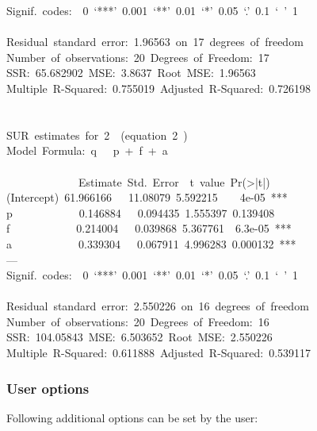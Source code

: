 \documentclass[article]{jss}
\begin{document}
{Signif.~codes:~~0~`***'~0.001~`**'~0.01~`*'~0.05~`.'~0.1~`~'~1~\\
~\\
Residual~standard~error:~1.96563~on~17~degrees~of~freedom~\\
Number~of~observations:~20~Degrees~of~Freedom:~17~\\
SSR:~65.682902~MSE:~3.8637~Root~MSE:~1.96563~\\
Multiple~R-Squared:~0.755019~Adjusted~R-Squared:~0.726198~\\
~\\
~\\
SUR~estimates~for~2~~(equation~2~)~\\
Model~Formula:~q~~~p~+~f~+~a\\
\\
\mbox{}~~~~~~~~~~~~~Estimate~Std.~Error~~t~value~Pr(>|t|)~\\
(Intercept)~61.966166~~~11.08079~5.592215~~~~4e-05~***~\\
p~~~~~~~~~~~~0.146884~~~0.094435~1.555397~0.139408~\\
f~~~~~~~~~~~~0.214004~~~0.039868~5.367761~~6.3e-05~***~\\
a~~~~~~~~~~~~0.339304~~~0.067911~4.996283~0.000132~***~\\
---~\\
Signif.~codes:~~0~`***'~0.001~`**'~0.01~`*'~0.05~`.'~0.1~`~'~1~\\
~\\
Residual~standard~error:~2.550226~on~16~degrees~of~freedom~\\
Number~of~observations:~20~Degrees~of~Freedom:~16~\\
SSR:~104.05843~MSE:~6.503652~Root~MSE:~2.550226~\\
Multiple~R-Squared:~0.611888~Adjusted~R-Squared:~0.539117~\\
}



\subsubsection{User options}

Following additional options can be set by the user:

\end{document}
